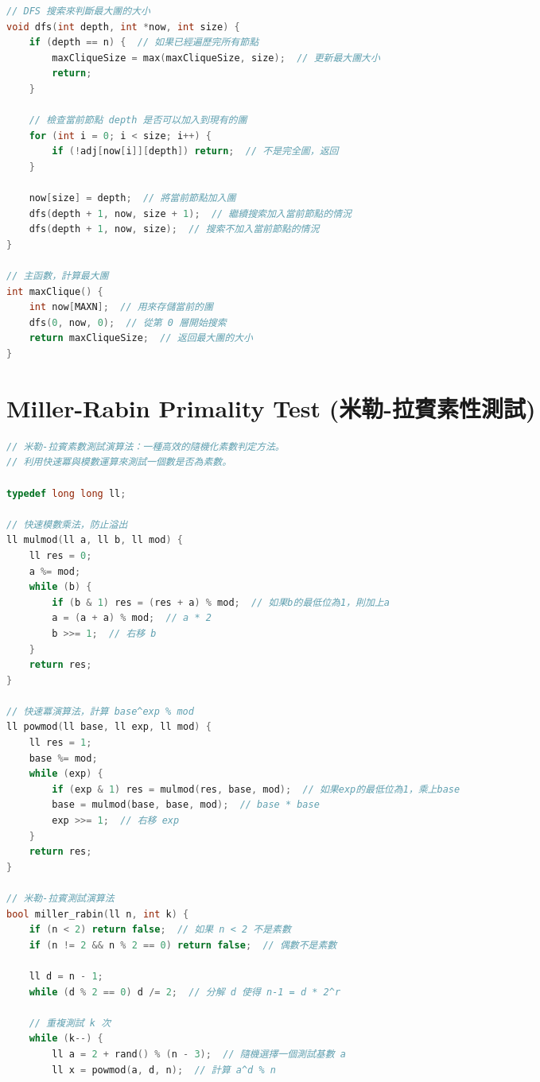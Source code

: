 \documentclass{article}
\begin{document}
\begin{multicols}{2}
\begin{lstlisting}[language=C++]
// DFS 搜索來判斷最大團的大小
void dfs(int depth, int *now, int size) {
    if (depth == n) {  // 如果已經遍歷完所有節點
        maxCliqueSize = max(maxCliqueSize, size);  // 更新最大團大小
        return;
    }

    // 檢查當前節點 depth 是否可以加入到現有的團
    for (int i = 0; i < size; i++) {
        if (!adj[now[i]][depth]) return;  // 不是完全圖，返回
    }

    now[size] = depth;  // 將當前節點加入團
    dfs(depth + 1, now, size + 1);  // 繼續搜索加入當前節點的情況
    dfs(depth + 1, now, size);  // 搜索不加入當前節點的情況
}

// 主函數，計算最大團
int maxClique() {
    int now[MAXN];  // 用來存儲當前的團
    dfs(0, now, 0);  // 從第 0 層開始搜索
    return maxCliqueSize;  // 返回最大團的大小
}
\end{lstlisting}

\section{Miller-Rabin Primality Test (米勒-拉賓素性測試)}

\begin{lstlisting}[language=C++]
// 米勒-拉賓素數測試演算法：一種高效的隨機化素數判定方法。
// 利用快速冪與模數運算來測試一個數是否為素數。

typedef long long ll;

// 快速模數乘法，防止溢出
ll mulmod(ll a, ll b, ll mod) {
    ll res = 0;
    a %= mod;
    while (b) {
        if (b & 1) res = (res + a) % mod;  // 如果b的最低位為1，則加上a
        a = (a + a) % mod;  // a * 2
        b >>= 1;  // 右移 b
    }
    return res;
}

// 快速冪演算法，計算 base^exp % mod
ll powmod(ll base, ll exp, ll mod) {
    ll res = 1;
    base %= mod;
    while (exp) {
        if (exp & 1) res = mulmod(res, base, mod);  // 如果exp的最低位為1，乘上base
        base = mulmod(base, base, mod);  // base * base
        exp >>= 1;  // 右移 exp
    }
    return res;
}

// 米勒-拉賓測試演算法
bool miller_rabin(ll n, int k) {
    if (n < 2) return false;  // 如果 n < 2 不是素數
    if (n != 2 && n % 2 == 0) return false;  // 偶數不是素數

    ll d = n - 1;
    while (d % 2 == 0) d /= 2;  // 分解 d 使得 n-1 = d * 2^r

    // 重複測試 k 次
    while (k--) {
        ll a = 2 + rand() % (n - 3);  // 隨機選擇一個測試基數 a
        ll x = powmod(a, d, n);  // 計算 a^d % n


\end{lstlisting}
\end{multicols}
\end{document}
